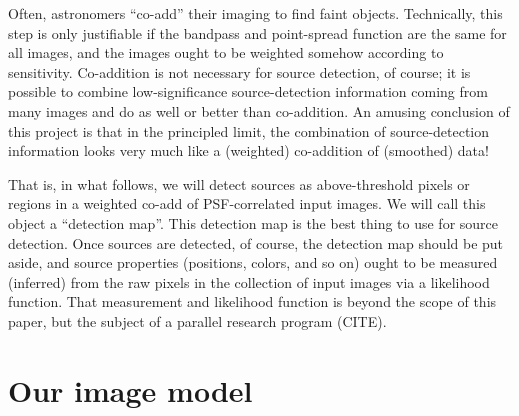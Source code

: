 \documentclass[letterpaper,preprint]{aastex}
\begin{document}
Often, astronomers ``co-add'' their imaging to find faint objects.
Technically, this step is only justifiable if the bandpass and
point-spread function are the same for all images, and the images
ought to be weighted somehow according to sensitivity.
Co-addition is not necessary for source detection, of course; it is
possible to combine low-significance source-detection information
coming from many images and do as well or better than co-addition.
An amusing conclusion of this project is that in the principled limit,
the combination of source-detection information looks very much like a
(weighted) co-addition of (smoothed) data!

That is, in what follows, we will detect sources as above-threshold
pixels or regions in a weighted co-add of PSF-correlated input images.
We will call this object a ``detection map''.
This detection map is the best thing to use for source detection.
Once sources are detected, of course, the detection map should be put
aside, and source properties (positions, colors, and so on) ought to
be measured (inferred) from the raw pixels in the collection of input
images via a likelihood function.
That measurement and likelihood function is beyond the scope of this
paper, but the subject of a parallel research program (CITE).

\section{Our image model}




\end{document}

